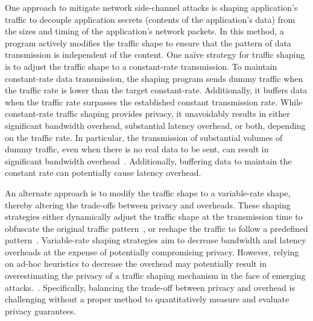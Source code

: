 One approach to mitigate network side-channel attacks is shaping application's traffic to decouple application secrets (\ie contents of the application's data) from the sizes and timing of the application's network packets.
In this method, a program actively modifies the traffic shape to ensure that the pattern of data transmission is independent of the content.  
One na\"ive strategy for traffic shaping is to adjust the traffic shape to a constant-rate transmission.
To maintain constant-rate data transmission, the shaping program sends dummy traffic when the traffic rate is lower than the target constant-rate. Additionally, it buffers data when the traffic rate surpasses the established constant transmission rate.
While constant-rate traffic shaping provides privacy, it unavoidably results in either significant bandwidth overhead, substantial latency overhead, or both, depending on the traffic rate.
In particular, the transmission of substantial volumes of dummy traffic, even when there is no real data to be sent, can result in significant bandwidth overhead~\cite{saponas2007devices}.
Additionally, buffering data to maintain the constant rate can potentially cause latency overhead.


An alternate approach is to modify the traffic shape to a variable-rate shape, thereby altering the trade-offs between privacy and overheads.
These shaping strategies either dynamically adjust the traffic shape at the transmission time to obfuscate the original traffic pattern~\cite{cai2014csbuflo, juarez2016wtfpad}, or reshape the traffic to follow a predefined pattern~\cite{wright2009traffic,wang2017walkie}.
Variable-rate shaping strategies aim to decrease bandwidth and latency overheads at the expense of potentially compromising privacy.
However, relying on ad-hoc heuristics to decrease the overhead may potentially result in overestimating the privacy of a traffic shaping mechanism in the face of emerging attacks.~\cite{sirinam2018df}. 
Specifically, balancing  the trade-off between privacy and overhead is challenging without a proper method to quantitatively measure and evaluate privacy guarantees. 

